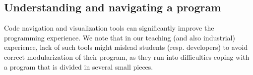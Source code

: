 %
%
%



\subsection{Understanding and navigating a program}
Code navigation and visualization tools can significantly improve the programming experience.
We note that in our teaching (and also industrial) experience, lack of such tools might mislead students (resp. developers) to avoid correct modularization of their program, as they run into difficulties coping with a program that is divided in several small pieces.

